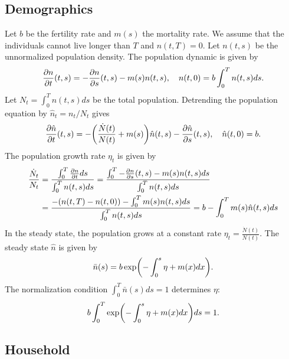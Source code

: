 \documentclass[a4paper, 12pt]{article}
\begin{document}
\subsection{Demographics}
Let $b$ be the fertility rate and $m(s)$ the mortality rate. We assume 
that the individuals cannot live longer than $T$ and $n(t, T) = 0$. Let 
$n(t,s)$ be the unnormalized population density. The population dynamic 
is given by 
\begin{equation}
    \frac{\partial{n}}{\partial{t}}(t, s) = -\frac{\partial{n}}{\partial{s}}(t, s) - m(s)n(t,s), \quad n(t, 0) = b\int_0^T n(t, s)ds.
\end{equation}
Let $N_t = \int_0^T n(t, s)ds$ be the total population. Detrending 
the population equation by $\hat{n}_t = n_t/N_t$ gives 
\begin{equation}
    \pd{\hat{n}}{t}(t, s) = -\pth{\frac{\dot{N}(t)}{N(t)} + m(s)}\hat{n}(t, s) - \pd{\hat{n}}{s}(t, s), 
    \quad \hat{n}(t, 0) = b. 
\end{equation} 
The population growth rate $\eta_t$ is given by 
\begin{equation}
    \begin{split}
        \frac{\dot{N}_t}{N_t} &= \frac{\int_0^T \frac{\partial{n}}{\partial{t}}ds}{\int_0^T n(t, s)ds} 
        = \frac{\int_0^T -\frac{\partial{n}}{\partial{s}}(t, s) - m(s)n(t,s)ds}{\int_0^T n(t, s)ds} \\
        &= \frac{-(n(t, T) - n(t, 0)) -\int_0^T m(s)n(t,s)ds}{\int_0^T n(t, s)ds} 
        = b - \int_0^T m(s)\hat{n}(t,s)ds
    \end{split}
\end{equation}
In the steady state, the population grows at a constant rate 
$\eta_t = \frac{\dot{N}(t)}{N(t)}$. The steady state $\hat{n}$ is 
given by 
\begin{equation}
    \bar{n}(s) = b\exp\pth{-\int_0^s \eta + m(x)dx}. 
\end{equation}
The normalization condition $\int_0^T \bar{n}(s)ds = 1$ 
determines $\eta$: 
\begin{equation}
    b\int_0^T \exp\pth{-\int_0^s \eta + m(x)dx}ds = 1.
\end{equation}

\subsection{Household}
\end{document}
